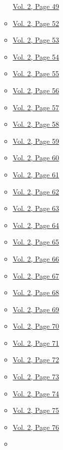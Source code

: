 \begin{itemize}
\begin{itemize}
    \protect\hyperlink{g-page-261}{Vol. 2, Page 49}
  \item
    \protect\hyperlink{g-page-264}{Vol. 2, Page 52}
  \item
    \protect\hyperlink{g-page-265}{Vol. 2, Page 53}
  \item
    \protect\hyperlink{g-page-266}{Vol. 2, Page 54}
  \item
    \protect\hyperlink{g-page-267}{Vol. 2, Page 55}
  \item
    \protect\hyperlink{g-page-268}{Vol. 2, Page 56}
  \item
    \protect\hyperlink{g-page-269}{Vol. 2, Page 57}
  \item
    \protect\hyperlink{g-page-270}{Vol. 2, Page 58}
  \item
    \protect\hyperlink{g-page-271}{Vol. 2, Page 59}
  \item
    \protect\hyperlink{g-page-272}{Vol. 2, Page 60}
  \item
    \protect\hyperlink{g-page-273}{Vol. 2, Page 61}
  \item
    \protect\hyperlink{g-page-274}{Vol. 2, Page 62}
  \item
    \protect\hyperlink{g-page-275}{Vol. 2, Page 63}
  \item
    \protect\hyperlink{g-page-276}{Vol. 2, Page 64}
  \item
    \protect\hyperlink{g-page-277}{Vol. 2, Page 65}
  \item
    \protect\hyperlink{g-page-278}{Vol. 2, Page 66}
  \item
    \protect\hyperlink{g-page-279}{Vol. 2, Page 67}
  \item
    \protect\hyperlink{g-page-280}{Vol. 2, Page 68}
  \item
    \protect\hyperlink{g-page-281}{Vol. 2, Page 69}
  \item
    \protect\hyperlink{g-page-282}{Vol. 2, Page 70}
  \item
    \protect\hyperlink{g-page-283}{Vol. 2, Page 71}
  \item
    \protect\hyperlink{g-page-284}{Vol. 2, Page 72}
  \item
    \protect\hyperlink{g-page-285}{Vol. 2, Page 73}
  \item
    \protect\hyperlink{g-page-286}{Vol. 2, Page 74}
  \item
    \protect\hyperlink{g-page-287}{Vol. 2, Page 75}
  \item
    \protect\hyperlink{g-page-288}{Vol. 2, Page 76}
  \item

\end{itemize}
\end{itemize}
